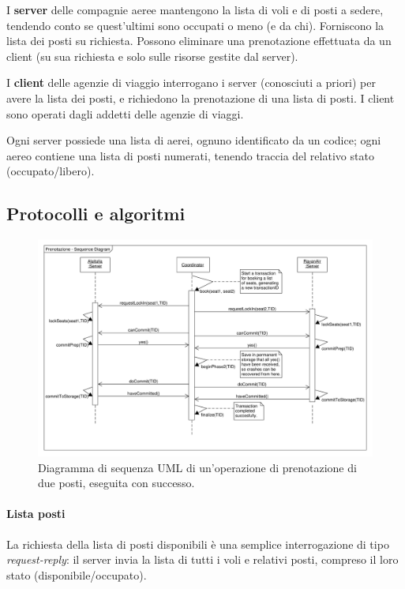 \documentclass[a4paper]{article}
\begin{document}
I \textbf{server} delle compagnie aeree mantengono la lista di voli e di posti a sedere, tendendo conto se quest'ultimi sono occupati o meno (e da chi). Forniscono la lista dei posti su richiesta. Possono eliminare una prenotazione effettuata da un client (su sua richiesta e solo sulle risorse gestite dal server).

I \textbf{client} delle agenzie di viaggio interrogano i server (conosciuti a priori) per avere la lista dei posti, e richiedono la prenotazione di una lista di posti. I client sono operati dagli addetti delle agenzie di viaggi.

Ogni server possiede una lista di aerei, ognuno identificato da un codice; ogni aereo contiene una lista di posti numerati, tenendo traccia del relativo stato (occupato/libero).


\subsection{Protocolli e algoritmi}
\begin{figure}[t]
	\centering
		\includegraphics[width=\textwidth]{fig/reserve_sequence.pdf}
		\caption{Diagramma di sequenza UML di un'operazione di prenotazione di due posti, eseguita con successo.}
		\label{fig:bookseq}
\end{figure}

\paragraph{Lista posti}La richiesta della lista di posti disponibili è una semplice interrogazione di tipo \textit{request-reply}: il server invia la lista di tutti i voli e relativi posti, compreso il loro stato (disponibile/occupato).
\end{document}
